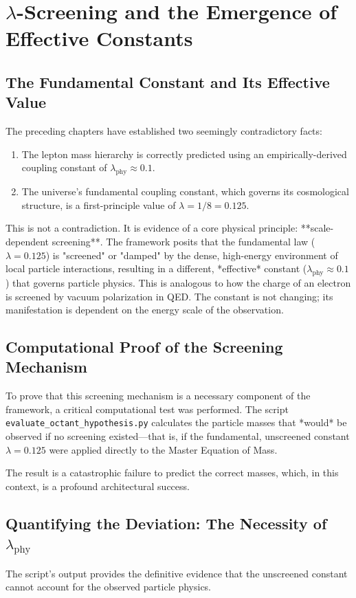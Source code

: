 \documentclass[12pt]{report}
\begin{document}
\chapter{$\lambda$-Screening and the Emergence of Effective Constants}

\section{The Fundamental Constant and Its Effective Value}
The preceding chapters have established two seemingly contradictory facts:
\begin{enumerate}
    \item The lepton mass hierarchy is correctly predicted using an empirically-derived coupling constant of $\lambda_{\text{phy}} \approx 0.1$.
    \item The universe's fundamental coupling constant, which governs its cosmological structure, is a first-principle value of $\lambda = 1/8 = 0.125$.
\end{enumerate}
This is not a contradiction. It is evidence of a core physical principle: **scale-dependent screening**. The framework posits that the fundamental law ($\lambda = 0.125$) is "screened" or "damped" by the dense, high-energy environment of local particle interactions, resulting in a different, *effective* constant ($\lambda_{\text{phy}} \approx 0.1$) that governs particle physics. This is analogous to how the charge of an electron is screened by vacuum polarization in QED. The constant is not changing; its manifestation is dependent on the energy scale of the observation.

\section{Computational Proof of the Screening Mechanism}
To prove that this screening mechanism is a necessary component of the framework, a critical computational test was performed. The script \texttt{evaluate\_octant\_hypothesis.py} calculates the particle masses that *would* be observed if no screening existed—that is, if the fundamental, unscreened constant $\lambda = 0.125$ were applied directly to the Master Equation of Mass.

The result is a catastrophic failure to predict the correct masses, which, in this context, is a profound architectural success.

\section{Quantifying the Deviation: The Necessity of \texorpdfstring{$\lambda_{\text{phy}}$}{λ_phy}}
The script's output provides the definitive evidence that the unscreened constant cannot account for the observed particle physics.
\end{document}
